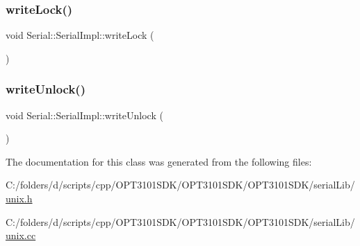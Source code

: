 \subsubsection{\texorpdfstring{write\+Lock()}{writeLock()}}
{\footnotesize\ttfamily void Serial\+::\+Serial\+Impl\+::write\+Lock (\begin{DoxyParamCaption}{ }\end{DoxyParamCaption})}

\mbox{\label{classserial_1_1serial_1_1_serial_1_1_serial_impl_adaec2b322f0b0793929da24f5bf09949}} 
\subsubsection{\texorpdfstring{write\+Unlock()}{writeUnlock()}}
{\footnotesize\ttfamily void Serial\+::\+Serial\+Impl\+::write\+Unlock (\begin{DoxyParamCaption}{ }\end{DoxyParamCaption})}



The documentation for this class was generated from the following files\+:\begin{DoxyCompactItemize}
\item 
C\+:/folders/d/scripts/cpp/\+O\+P\+T3101\+S\+D\+K/\+O\+P\+T3101\+S\+D\+K/\+O\+P\+T3101\+S\+D\+K/serial\+Lib/\mbox{\hyperlink{unix_8h}{unix.\+h}}\item 
C\+:/folders/d/scripts/cpp/\+O\+P\+T3101\+S\+D\+K/\+O\+P\+T3101\+S\+D\+K/\+O\+P\+T3101\+S\+D\+K/serial\+Lib/\mbox{\hyperlink{unix_8cc}{unix.\+cc}}\end{DoxyCompactItemize}
